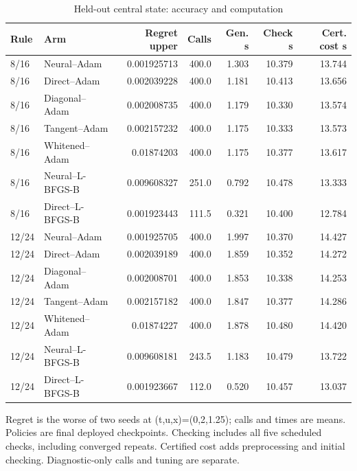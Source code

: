 \begin{table}[htbp]\centering\small
\caption{Held-out central state: accuracy and computation}\label{tab:r24heldout}
\begin{tabular}{llrrrrr}\toprule
Rule & Arm & Regret upper & Calls & Gen. s & Check s & Cert. cost s\\\midrule
8/16 & Neural--Adam & 0.001925713 & 400.0 & 1.303 & 10.379 & 13.744\\
8/16 & Direct--Adam & 0.002039228 & 400.0 & 1.181 & 10.413 & 13.656\\
8/16 & Diagonal--Adam & 0.002008735 & 400.0 & 1.179 & 10.330 & 13.574\\
8/16 & Tangent--Adam & 0.002157232 & 400.0 & 1.175 & 10.333 & 13.573\\
8/16 & Whitened--Adam & 0.01874203 & 400.0 & 1.175 & 10.377 & 13.617\\
8/16 & Neural--L-BFGS-B & 0.009608327 & 251.0 & 0.792 & 10.478 & 13.333\\
8/16 & Direct--L-BFGS-B & 0.001923443 & 111.5 & 0.321 & 10.400 & 12.784\\
12/24 & Neural--Adam & 0.001925705 & 400.0 & 1.997 & 10.370 & 14.427\\
12/24 & Direct--Adam & 0.002039189 & 400.0 & 1.859 & 10.352 & 14.272\\
12/24 & Diagonal--Adam & 0.002008701 & 400.0 & 1.853 & 10.338 & 14.253\\
12/24 & Tangent--Adam & 0.002157182 & 400.0 & 1.847 & 10.377 & 14.286\\
12/24 & Whitened--Adam & 0.01874227 & 400.0 & 1.878 & 10.480 & 14.420\\
12/24 & Neural--L-BFGS-B & 0.009608181 & 243.5 & 1.183 & 10.479 & 13.722\\
12/24 & Direct--L-BFGS-B & 0.001923667 & 112.0 & 0.520 & 10.457 & 13.037\\
\bottomrule\end{tabular}
\par\smallskip\begin{minipage}{.97\textwidth}\footnotesize Regret is the worse of two seeds at (t,u,x)=(0,2,1.25); calls and times are means. Policies are final deployed checkpoints. Checking includes all five scheduled checks, including converged repeats. Certified cost adds preprocessing and initial checking. Diagnostic-only calls and tuning are separate.\end{minipage}
\end{table}
